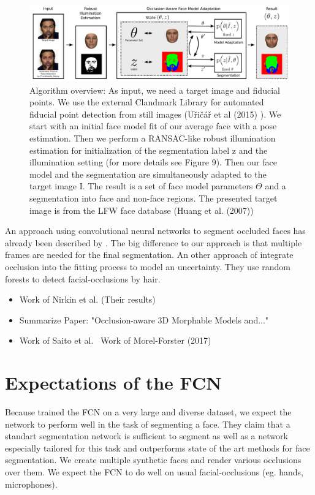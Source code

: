 \begin{figure}
	\centering
	\includegraphics[width=1\linewidth]{Figures/chap1/EGGER's_method.png}
	\caption[caption without footnote, for lof]{\footnotemark Algorithm overview: As input, we need a target image and fiducial points. We use the external Clandmark Library for automated fiducial point detection from still images (U\v ri\v c\' a\v r et al (2015) \cite{Uricar}). We start with an initial face model fit of our average face with a pose estimation. Then we perform a RANSAC-like robust illumination estimation for initialization of the segmentation label z and the illumination setting (for more details see Figure 9). Then our face model and the segmentation are simultaneously adapted to the target image I. The result is a set of face model parameters $\Theta$ and a segmentation into face and non-face regions. The presented target image is from the LFW face database (Huang et al. (2007))}
	\label{fig:EGGER's_method}
\end{figure}


An approach using convolutional neural networks to segment occluded faces has already been described by \cite{SaitoEtAl}. The big difference to our approach is that multiple frames are needed for the final segmentation. An other approach of \cite{MorelForster} integrate occlusion into the fitting process to model an uncertainty. They use random forests to detect facial-occlusions by hair.

\begin{itemize}
	\item Work of Nirkin et al. (Their results)
	\item Summarize Paper: "Occlusion-aware 3D Morphable Models and..."
	\item Work of Saito et al.
	\ Work of Morel-Forster (2017)
\end{itemize}

\section{Expectations of the FCN}
Because \cite{nirkin2018_faceswap} trained the FCN on a very large and diverse dataset, we expect the network to perform well in the task of segmenting a face. They claim that a standart segmentation network is sufficient to segment as well as a network especially tailored for this task and outperforms state of the art methods for face segmentation. We create multiple synthetic faces and render various occlusions over them. We expect the FCN to do well on usual facial-occlusions (eg. hands, microphones).

